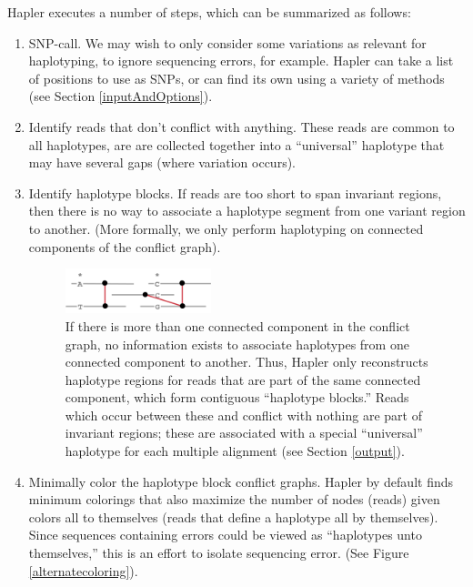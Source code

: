 \documentclass[11pt]{llncs}
\begin{document}
Hapler executes a number of steps, which can be summarized as follows:
\begin{enumerate}
	
	\item SNP-call. We may wish to only consider some variations as relevant for haplotyping, to ignore sequencing errors, for example. Hapler can 
	take a list of positions to use as SNPs, or can find its own using a variety of methods (see Section \ref{inputAndOptions}).
	
	\item Identify reads that don't conflict with anything. These reads are common to all haplotypes, are are collected together into a ``universal''
	haplotype that may have several gaps (where variation occurs).
	
	\item Identify haplotype blocks. If reads are too short to span invariant regions, then there is no way to associate a haplotype segment from
	one variant region to another. (More formally, we only perform haplotyping on connected components of the conflict graph).

\begin{figure}[!h]
\centering
   \includegraphics[width=0.4\textwidth]{graphics/haplotype_blocks}
   \caption{If there is more than one connected component in the conflict graph, no information exists to associate haplotypes from
   one connected component to another. Thus, Hapler only reconstructs haplotype regions for reads that are part of the same connected 
   component, which form contiguous ``haplotype blocks.'' Reads which occur between these and conflict with nothing are part of invariant
   regions; these are associated with a special ``universal'' haplotype for each multiple alignment (see Section \ref{output}).}
   \label{bicolor}
\end{figure}

	
	\item Minimally color the haplotype block conflict graphs. Hapler by default finds minimum colorings that also maximize the number of nodes 
	(reads) given colors all to themselves (reads that define a haplotype all by themselves). Since sequences containing errors could be viewed as 
	``haplotypes unto themselves,'' this is an effort to isolate sequencing error. (See Figure \ref{alternatecoloring}).	
	

\end{enumerate}
\end{document}
